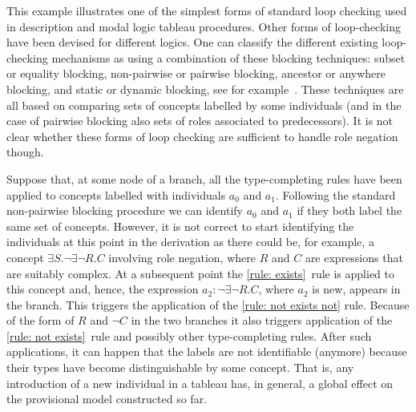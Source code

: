 \documentclass[leqno
,pdflatex
,prodmode
,acmtocl
]{acmsmall}
\def\Not{\neg}
\newcommand{\indiv}{a}
\begin{document}
This example illustrates one of the simplest forms of standard loop checking
used in description and modal logic tableau procedures.
Other forms of loop-checking have been devised for different logics.
One can classify the different existing loop-checking mechanisms as using a
combination of these blocking techniques:
subset or equality blocking, non-pairwise or pairwise blocking,
ancestor or anywhere blocking, and static or dynamic blocking, see for example~\cite{BaaderSattler-OTADL-2001}.
These techniques are all based on comparing sets of concepts labelled by some
individuals (and in the case of pairwise blocking also sets of roles
associated to predecessors).
It is not clear whether these forms of loop checking are sufficient to handle role
negation though.

Suppose that, at some node of a branch, all the type-completing
rules have been applied to concepts labelled with individuals $\indiv_0$
and $\indiv_1$.
Following the standard non-pairwise blocking procedure
we can identify $\indiv_0$ and $\indiv_1$
if they both label the same set of concepts.
However, it is not correct to start identifying the individuals
at this point in the derivation as there could be, for example, a concept $\exists
S.\Not\exists\Not R.C$ involving role negation, where $R$ and $C$ are expressions that are suitably complex.
At a subsequent point the 
\eqref{rule: exists}~rule is applied to this concept and, hence,
the expression $\indiv_2:\Not\exists\Not R.C$,
where $\indiv_2$ is new,
appears in the branch. This triggers the application of
the \eqref{rule: not exists not} rule. Because of the form of $R$
and $\neg C$ in the two branches it also triggers application of the
\eqref{rule: not exists}~rule and
possibly other type-completing rules.
After such applications, it can happen that the labels are not
identifiable (anymore)
because their types have become distinguishable by some concept. 
That is, any introduction of a new individual in a tableau 
has, in general, a global effect on the provisional model
constructed so far.
\end{document}
